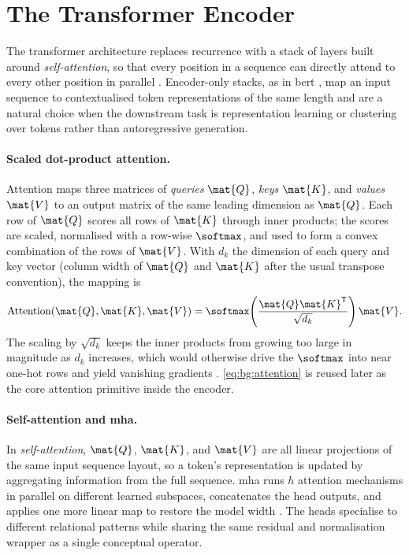 \section{The Transformer Encoder}\label{sec:bg:transformer}

The transformer architecture replaces recurrence with a stack of layers built around \emph{self-attention}, so that every position in a sequence can directly attend to every other position in parallel \parencite{vaswani2017attention}.
Encoder-only stacks, as in \gls{bert} \parencite{devlin2019bert}, map an input sequence to contextualised token representations of the same length and are a natural choice when the downstream task is representation learning or clustering over tokens rather than autoregressive generation.

\paragraph{Scaled dot-product attention.}
Attention maps three matrices of \emph{queries} $\mat{Q}$, \emph{keys} $\mat{K}$, and \emph{values} $\mat{V}$ to an output matrix of the same leading dimension as $\mat{Q}$.
Each row of $\mat{Q}$ scores all rows of $\mat{K}$ through inner products; the scores are scaled, normalised with a row-wise $\softmax$, and used to form a convex combination of the rows of $\mat{V}$.
With $d_k$ the dimension of each query and key vector (column width of $\mat{Q}$ and $\mat{K}$ after the usual transpose convention), the mapping is
\begin{equation}\label{eq:bg:attention}
  \mathrm{Attention}(\mat{Q}, \mat{K}, \mat{V})
  =
  \softmax\!\left(\frac{\mat{Q}\mat{K}^{\mathsf{T}}}{\sqrt{d_k}}\right)\mat{V}.
\end{equation}
The scaling by $\sqrt{d_k}$ keeps the inner products from growing too large in magnitude as $d_k$ increases, which would otherwise drive the $\softmax$ into near one-hot rows and yield vanishing gradients \parencite{vaswani2017attention}.
\cref{eq:bg:attention} is reused later as the core attention primitive inside the encoder.

\paragraph{Self-attention and \gls{mha}.}
In \emph{self-attention}, $\mat{Q}$, $\mat{K}$, and $\mat{V}$ are all linear projections of the same input sequence layout, so a token's representation is updated by aggregating information from the full sequence.
\Gls{mha} runs $h$ attention mechanisms in parallel on different learned subspaces, concatenates the head outputs, and applies one more linear map to restore the model width \parencite{vaswani2017attention}.
The heads specialise to different relational patterns while sharing the same residual and normalisation wrapper as a single conceptual operator.

